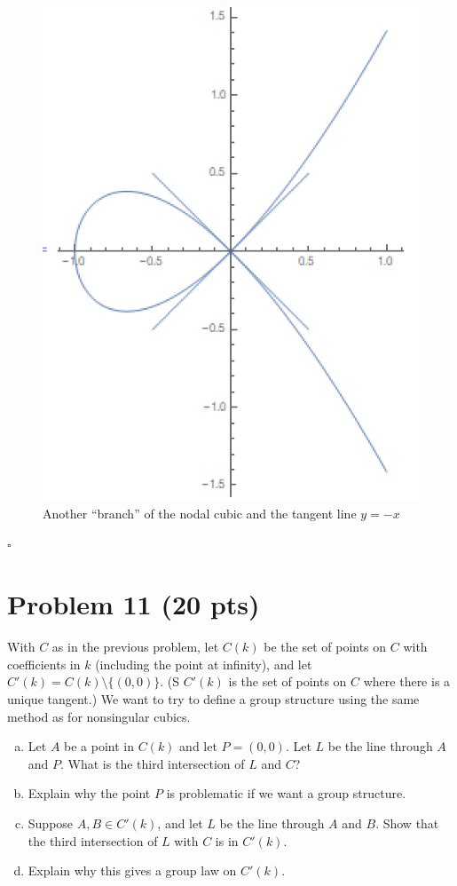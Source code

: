 \documentclass[12pt]{article}
\begin{document}
\begin{figure}[!htb]
	\centering
	\includegraphics[scale=0.6]{ag5}
	\caption{Another ``branch'' of the nodal cubic and the tangent line $y=-x$}
\end{figure}



\hfill $\square$


\newpage


\section*{Problem 11 \small{(20 pts)}}

With $C$ as in the previous problem, let $C(k)$ be the set of points on $C$ with coefficients in $k$ (including the point at infinity), and let $C'(k) = C(k)\setminus \{(0,0)\}$. (S $C'(k)$ is the set of points on $C$ where there is a unique tangent.) We want to try to define a group structure using the same method as for nonsingular cubics. 
\begin{enumerate}[(a)]
	\item Let $A$ be a point in $C(k)$ and let $P = (0,0)$. Let $L$ be the line through $A$ and $P$. What is the third intersection of $L$ and $C$?
	\item Explain why the point $P$ is problematic if we want a group structure.
	\item Suppose $A,B \in C'(k)$, and let $L$ be the line through $A$ and $B$. Show that the third intersection of $L$ with $C$ is in $C'(k)$. 
	\item Explain why this gives a group law on $C'(k)$. 
\end{enumerate}
\end{document}
